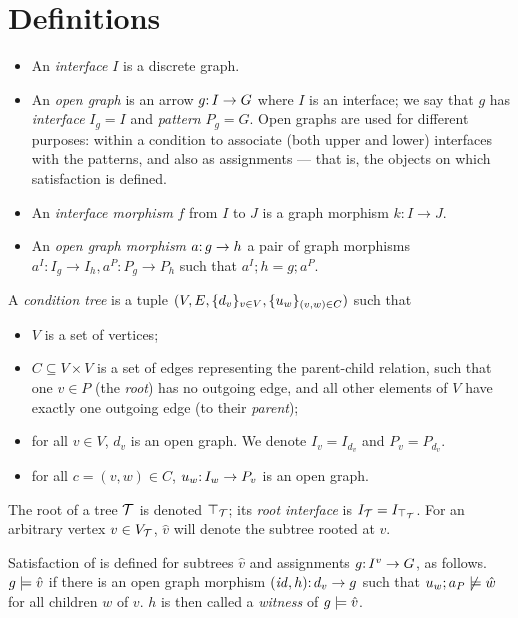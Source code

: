 \section{Definitions}
\label{sec:definitions}

\begin{itemize}
\item An \emph{interface} $I$ is a discrete graph.

\item An \emph{open graph} is an arrow $g{:}\, I\rightarrow G$ where $I$ is an interface; we say that $g$ has \emph{interface} $I_g=I$ and \emph{pattern} $P_g=G$. Open graphs are used for different purposes: within a condition to associate (both upper and lower) interfaces with the patterns, and also as assignments --- that is, the objects on which satisfaction is defined.

\item An \emph{interface morphism} $f$ from $I$ to $J$ is a graph morphism $k:I\to J$.

\item An \emph{open graph morphism} $a{:}\, g\rightarrow h$ a pair of graph morphisms $a^I:I_g\to I_h, a^P:P_g\to P_h$ such that $a^I;h=g;a^P$.
\end{itemize}
%
A \emph{condition tree} is a tuple $(V,E,\{{d_v}\}_{v\in V},\{{u_w}\}_{(v,w)\in C})$ such that

\begin{itemize}
\item $V$ is a set of vertices;

\item $C\subseteq V\times V$ is a set of edges representing the parent-child relation, such that one $v\in P$ (the \emph{root}) has no outgoing edge, and all other elements of $V$ have exactly one outgoing edge (to their \emph{parent});

\item for all $v\in V$, $d_v$ is an open graph. We denote $I_v=I_{d_v}$ and $P_v=P_{d_v}$.

\item for all $c=(v,w)\in C$, $u_w{:}\, I_w\rightarrow P_v$ is an open graph.
\end{itemize}
%
The root of a tree ${\mathcal{T}}$ is denoted $\top_{{\mathcal{T}}}$; its \emph{root interface} is $I_{\mathcal{T}}=I_{\top_{{\mathcal{T}}}}$. For an arbitrary vertex $v\in V_{\mathcal{T}}$, $\hat v$ will denote the subtree rooted at $v$.

\medskip\noindent Satisfaction of is defined for subtrees $\hat v$ and assignments $g{:}\, I^v\rightarrow G$, as follows. $g\models \hat v$ if there is an open graph morphism $({\mathit{id}},h){:}\, d_v\rightarrow g$ such that $u_w;a_P\not\models \hat w$ for all children $w$ of $v$. $h$ is then called a \emph{witness} of $g\models \hat v$.


